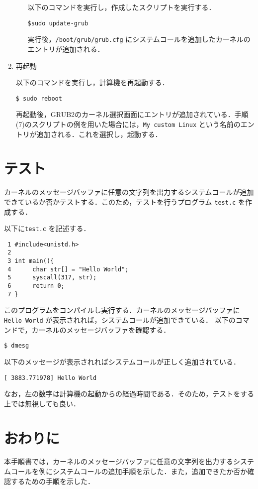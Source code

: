 \documentclass[12pt]{jsarticle}
\begin{document}
\begin{enumerate}
\begin{enumerate}
以下のコマンドを実行し，作成したスクリプトを実行する．
\begin{verbatim}
$sudo update-grub
\end{verbatim}
実行後，\verb|/boot/grub/grub.cfg| にシステムコールを追加したカーネルのエントリが追加される．

\end{enumerate}

\item 再起動

以下のコマンドを実行し，計算機を再起動する．
\begin{verbatim}
$ sudo reboot
\end{verbatim}
再起動後，GRUB2のカーネル選択画面にエントリが追加されている．手順(7)のスクリプトの例を用いた場合には，\verb|My custom Linux| という名前のエントリが追加される．これを選択し，起動する．


\end{enumerate}




\section{テスト}\label{sec:test}

カーネルのメッセージバッファに任意の文字列を出力するシステムコールが追加できているか否かテストする．このため，テストを行うプログラム \verb|test.c| を作成する．

以下に\verb|test.c| を記述する．
\begin{spacing}{0.7}
\begin{verbatim}
 1 #include<unistd.h>
 2
 3 int main(){
 4      char str[] = "Hello World";
 5      syscall(317, str);
 6      return 0;
 7 }
\end{verbatim}
\end{spacing}
このプログラムをコンパイルし実行する．カーネルのメッセージバッファに\verb|Hello World| が表示されれば，システムコールが追加できている．
以下のコマンドで，カーネルのメッセージバッファを確認する．
\begin{verbatim}
$ dmesg
\end{verbatim}
以下のメッセージが表示されればシステムコールが正しく追加されている．
\begin{verbatim}
[ 3883.771978] Hello World
\end{verbatim}
なお，左の数字は計算機の起動からの経過時間である．そのため，テストをする上では無視しても良い．

\section{おわりに}\label{sec:conclusion}
本手順書では，カーネルのメッセージバッファに任意の文字列を出力するシステムコールを例にシステムコールの追加手順を示した．また，追加できたか否か確認するための手順を示した．
\end{document}
